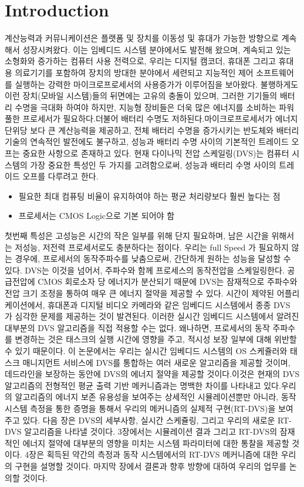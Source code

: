 \documentclass[11pt
  , a4paper
  , article
  , oneside
]{memoir}
\begin{document}
\chapter{Introduction}
계산능력과 커뮤니케이션은 플랫폼 및 장치를 이동성 및 휴대가 가능한 방향으로 계속해서 성장시켜왔다. 이는 임베디드 시스템 분야에서도 발전해 왔으며, 계속되고 있는 소형화와 증가하는 컴퓨터 사용 전력으로, 우리는 디지털 캠코더, 휴대폰 그리고 휴대용 의료기기를 포함하여 장치의 방대한 분야에서 세련되고 지능적인 제어 소프트웨어를 실행하는 강력한 마이크로프로세서의 사용증가가 이루어짐을 보아왔다. 불행하게도 이런 장치(모바일 시스템)들의 뒤면에는 고유의 충돌이 있으며, 그러한 기기들의 배터리 수명을 극대화 하여야 하지만, 지능형 장비들은 더욱 많은 에너지를 소비하는 파워풀한 프로세서가 필요하다.더불어 배터리 수명도 저하된다.마이크로프로세서가 에너지 단위당 보다 큰 계산능력을 제공하고, 전체 배터리 수명을 증가시키는 반도체와 배터리 기술의 연속적인 발전에도 불구하고, 성능과 배터리 수명 사이의 기본적인 트레이드 오프는 중요한 사항으로 존재하고 있다. 현재 다이나믹 전압 스케일링(DVS)는 컴퓨터 시스템의 가장 중요한 특성인 두 가지를 고려함으로써, 성능과 배터리 수명 사이의 트레이드 오프를 다루려고 한다. 

\begin{itemize}
	\item 필요한 최대 컴퓨팅 비율이 유지하여야 하는 평균 처리량보다 훨씬 높다는 점
	\item 프로세서는 CMOS Logic으로 기본 되어야 함
\end{itemize}
 
첫번째 특성은 고성능은 시간의 작은 일부를 위해 단지 필요하며, 남은 시간을 위해서는   저성능, 저전력 프로세서로도 충분하다는 점이다. 우리는 full Speed 가 필요하지 않는 경우에, 프로세서의 동작주파수를 낮춤으로써, 간단하게 원하는 성능을 달성할 수 있다. DVS는 이것을 넘어서, 주파수와 함께 프로세스의 동작전압을 스케일링한다. 공급전압에 CMOS 회로소자 당 에너지가 분산되기 때문에 DVS는 잠재적으로 주파수와 전압 크기 조정을 통하여 매우 큰 에너지 절약을 제공할 수 있다. 시간이 제약된 어플리케이션에서, 휴대폰과 디지털 비디오 카메라와 같은 임베디드 시스템에서 종종 DVS 가 심각한 문제를 제공하는 것이 발견된다. 이러한 실시간 임베디드 시스템에서 알려진 대부분의 DVS 알고리즘을 직접 적용할 수는 없다. 왜나하면, 프로세서의 동작 주파수를 변경하는 것은 태스크의 실행 시간에 영향을 주고, 적시성 보장 일부에 대해 위반할 수 있기 때문이다. 이 논문에서는 우리는 실시간 임베디드 시스템의 OS 스케쥴러와 태스크 매니지먼트 서비스에 DVS를 통합하는 여러 새로운 알고리즘을 제공할 것이며, 데드라인을 보장하는 동안에 DVS의 에너지 절약을 제공할 것이다.이것은 현재의 DVS 알고리즘의 전형적인 평균 출력 기반 메커니즘과는 명백한 차이를 나타내고 있다.우리의 알고리즘의 에너지 보존 유용성을 보여주는 상세적인 시뮬레이션뿐만 아니라, 동작 시스템 측정을 통한 증명을 통해서 우리의 메커니즘의 실제적 구현(RT-DVS)을 보여주고 있다. 다음 장은 DVS의 세부사항, 실시간 스케쥴링, 그리고 우리의 새로운 RT-DVS 알고리즘을 나타낼 것이다. 3장에서는 시뮬레이션 결과 그리고 RT-DVS의 잠재적인 에너지 절약에 대부분의 영향을 미치는 시스템 파라미터에 대한 통찰을 제공할 것이다. 4장은 획득된 약간의 측정과 동작 시스템에서의 RT-DVS 메커니즘에 대한 우리의 구현을 설명할 것이다. 마지막 장에서 결론과 향후 방향에 대하여 우리의 업무를 논의할 것이다.   
 
\end{document}
